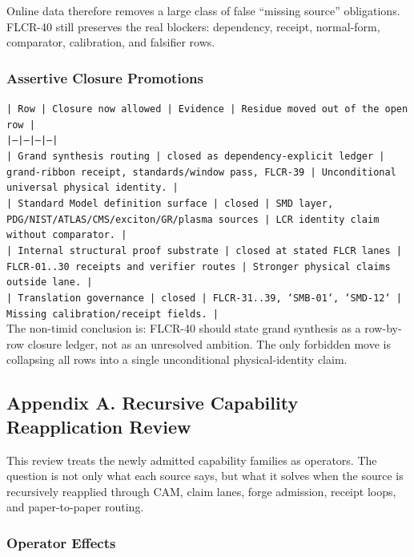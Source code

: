 \documentclass[11pt]{article}
\begin{document}
Online data therefore removes a large class of false “missing source” obligations. FLCR-40 still preserves the real blockers: dependency, receipt, normal-form, comparator, calibration, and falsifier rows.

\subsubsection*{Assertive Closure Promotions}

\noindent\texttt{| Row | Closure now allowed | Evidence | Residue moved out of the open row |}\\
\noindent\texttt{|---|---|---|---|}\\
\noindent\texttt{| Grand synthesis routing | closed as dependency-explicit ledger | grand-ribbon receipt, standards/window pass, FLCR-39 | Unconditional universal physical identity. |}\\
\noindent\texttt{| Standard Model definition surface | closed | SMD layer, PDG/NIST/ATLAS/CMS/exciton/GR/plasma sources | LCR identity claim without comparator. |}\\
\noindent\texttt{| Internal structural proof substrate | closed at stated FLCR lanes | FLCR-01..30 receipts and verifier routes | Stronger physical claims outside lane. |}\\
\noindent\texttt{| Translation governance | closed | FLCR-31..39, `SMB-01`, `SMD-12` | Missing calibration/receipt fields. |}\\

The non-timid conclusion is: FLCR-40 should state grand synthesis as a row-by-row closure ledger, not as an unresolved ambition. The only forbidden move is collapsing all rows into a single unconditional physical-identity claim.

\subsection*{Appendix A. Recursive Capability Reapplication Review}

This review treats the newly admitted capability families as operators. The question is not only what each source says, but what it solves when the source is recursively reapplied through CAM, claim lanes, forge admission, receipt loops, and paper-to-paper routing.

\subsubsection*{Operator Effects}
\end{document}
